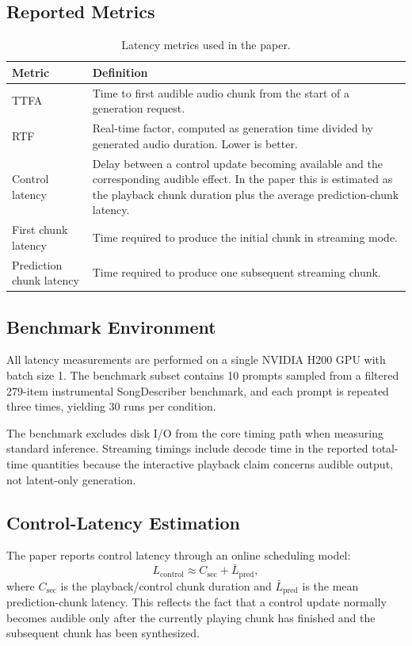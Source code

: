 \documentclass[11pt]{article}
\begin{document}
\subsection{Reported Metrics}

\begin{table}[H]
\centering
\caption{Latency metrics used in the paper.}
\label{tab:supp_latency_defs}
\begin{tabularx}{\textwidth}{@{}lX@{}}
\toprule
\textbf{Metric} & \textbf{Definition} \\
\midrule
TTFA & Time to first audible audio chunk from the start of a generation request. \\
RTF & Real-time factor, computed as generation time divided by generated audio duration. Lower is better. \\
Control latency & Delay between a control update becoming available and the corresponding audible effect. In the paper this is estimated as the playback chunk duration plus the average prediction-chunk latency. \\
First chunk latency & Time required to produce the initial chunk in streaming mode. \\
Prediction chunk latency & Time required to produce one subsequent streaming chunk. \\
\bottomrule
\end{tabularx}
\end{table}

\subsection{Benchmark Environment}

All latency measurements are performed on a single NVIDIA H200 GPU with batch size 1. The benchmark subset contains 10 prompts sampled from a filtered 279-item instrumental SongDescriber benchmark, and each prompt is repeated three times, yielding 30 runs per condition.

The benchmark excludes disk I/O from the core timing path when measuring standard inference. Streaming timings include decode time in the reported total-time quantities because the interactive playback claim concerns audible output, not latent-only generation.

\subsection{Control-Latency Estimation}

The paper reports control latency through an online scheduling model:
\[
L_{\mathrm{control}} \approx C_{\mathrm{sec}} + \bar{L}_{\mathrm{pred}},
\]
where \(C_{\mathrm{sec}}\) is the playback/control chunk duration and \(\bar{L}_{\mathrm{pred}}\) is the mean prediction-chunk latency. This reflects the fact that a control update normally becomes audible only after the currently playing chunk has finished and the subsequent chunk has been synthesized.
\end{document}
